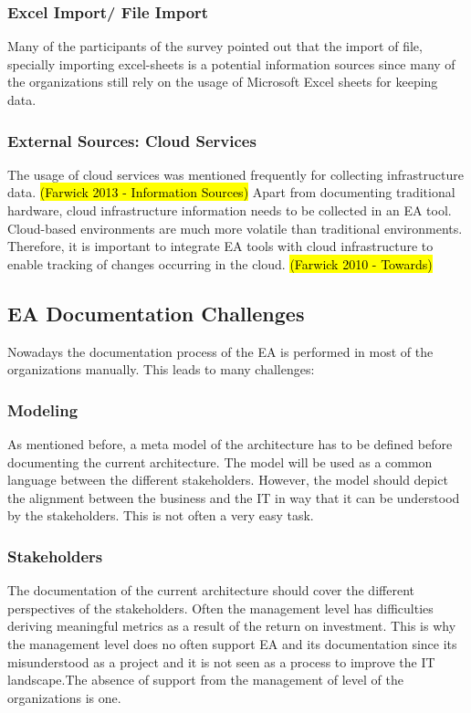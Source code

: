 \subsubsection{Excel Import/ File Import}
Many of the participants of the survey pointed out that the import of file, specially importing excel-sheets is a potential information sources since many of the organizations still rely on the usage of Microsoft Excel sheets for keeping data.

\subsubsection{External Sources: Cloud Services}

The usage of cloud services was mentioned frequently for collecting infrastructure data. \hl{(Farwick 2013 - Information Sources)} Apart from documenting traditional hardware, cloud infrastructure information needs to be collected in an EA tool. Cloud-based environments are much more volatile than traditional environments. Therefore, it is important to integrate EA tools with cloud infrastructure to enable tracking of changes occurring in the cloud. \hl{(Farwick 2010 - Towards)}


\subsection{EA Documentation Challenges}

Nowadays the documentation process of the EA is performed in most of the organizations manually. This leads to many challenges:

\subsubsection{Modeling}
As mentioned before, a meta model of the architecture has to be defined before documenting the current architecture. The model will be used as a common language between the different stakeholders. However, the model should depict the alignment between the business and the IT in way that it can be understood by the stakeholders. This is not often a very easy task.

\subsubsection{Stakeholders}
The documentation of the current architecture should cover the different perspectives of the stakeholders. Often the management level has difficulties deriving meaningful metrics as a result of the return on investment. This is why the management level does no often support EA and its documentation since its misunderstood as a project and it is not seen as a process to improve the IT landscape.The absence of support from the management of level of the organizations is one.

